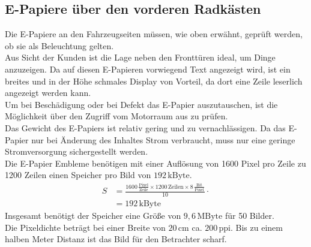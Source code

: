 \subsection{E-Papiere über den vorderen Radkästen}
Die E-Papiere an den Fahrzeugseiten müssen, wie oben erwähnt, geprüft werden, ob sie als Beleuchtung gelten.\\
Aus Sicht der Kunden ist die Lage neben den Fronttüren ideal, um Dinge anzuzeigen.
Da auf diesen E-Papieren vorwiegend Text angezeigt wird, ist ein breites und in der Höhe schmales Display von Vorteil, da dort eine Zeile leserlich angezeigt werden kann. \\
Um bei Beschädigung oder bei Defekt das E-Papier auszutauschen, ist die Möglichkeit über den Zugriff vom Motorraum aus zu prüfen. \\
Das Gewicht des E-Papiers ist relativ gering und zu vernachlässigen.
Da das E-Papier nur bei Änderung des Inhaltes Strom verbraucht, muss nur eine geringe Stromversorgung sichergestellt werden. \\
Die E-Papier Embleme benötigen mit einer Auflösung von 1600 Pixel pro Zeile zu 1200 Zeilen einen Speicher pro Bild von $ 192\,\mathrm{kByte} $.
\begin{align}
	S &= \frac{1600\,\frac{\mathrm{Pixel}}{\mathrm{Zeile}} \times 1200\,\mathrm{Zeilen} \times 8\,\frac{\mathrm{Bit}}{\mathrm{Pixel}}}{10} \cdot \\
	&= 192\,\mathrm{kByte}
\end{align}
Insgesamt benötigt der Speicher eine Größe von $ 9,6\,\mathrm{MByte} $ für 50 Bilder. \\
Die Pixeldichte beträgt bei einer Breite von $ 20\,\mathrm{cm} $ ca. $ 200\,\mathrm{ppi} $. Bis zu einem halben Meter Distanz ist das Bild für den Betrachter scharf.
